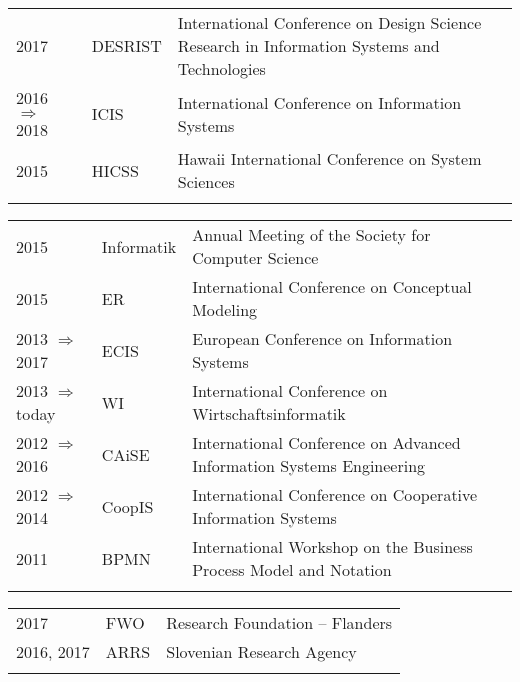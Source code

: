 \vspace{0.5cm}
\vspace{0.3cm}

\raggedright
\begin{tabular}{P{2.5cm}P{2cm}P{11cm}}

2017											& DESRIST		& International Conference on Design Science Research in Information Systems and Technologies\\\noalign{\smallskip}
2016 $\Rightarrow$ 2018			& ICIS				& International Conference on Information Systems\\\noalign{\smallskip}
2015											& HICSS			& Hawaii International Conference on System Sciences\\\noalign{\smallskip}
\end{tabular}
\begin{tabular}{P{2.5cm}P{2cm}P{11cm}}
2015											& Informatik		& Annual Meeting of the Society for Computer Science\\\noalign{\smallskip}
2015											& ER					& International Conference on Conceptual Modeling\\\noalign{\smallskip}
2013 $\Rightarrow$ 2017			& ECIS				& European Conference on Information Systems\\\noalign{\smallskip}
2013 $\Rightarrow$ today			& WI					& International Conference on Wirtschaftsinformatik\\\noalign{\smallskip}
2012 $\Rightarrow$ 2016			& CAiSE			& International Conference  on Advanced Information Systems Engineering\\\noalign{\smallskip}
2012 $\Rightarrow$ 2014			& CoopIS			& International Conference on Cooperative Information Systems\\\noalign{\smallskip}
2011											& BPMN			& International  Workshop on the Business Process Model and Notation\\\noalign{\smallskip}

\end{tabular}

\pagebreak
\vspace{0.5cm}
\vspace{0.3cm}

\raggedright
\begin{tabular}{P{2.5cm}P{2cm}P{11cm}}
2017				& FWO 	& Research Foundation – Flanders  \\\noalign{\smallskip}
2016, 2017		& ARRS & Slovenian Research Agency \\\noalign{\smallskip}
\end{tabular}